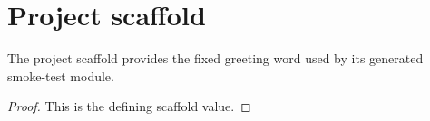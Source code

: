 \chapter{Project scaffold}
\label{ch:PhyxMiniRun_Basic}
\begin{definition}
  \label{def:project:hello}
  The project scaffold provides the fixed greeting word used by its generated smoke-test module.
\end{definition}
\begin{proof}

\leanok
  This is the defining scaffold value.
\end{proof}
